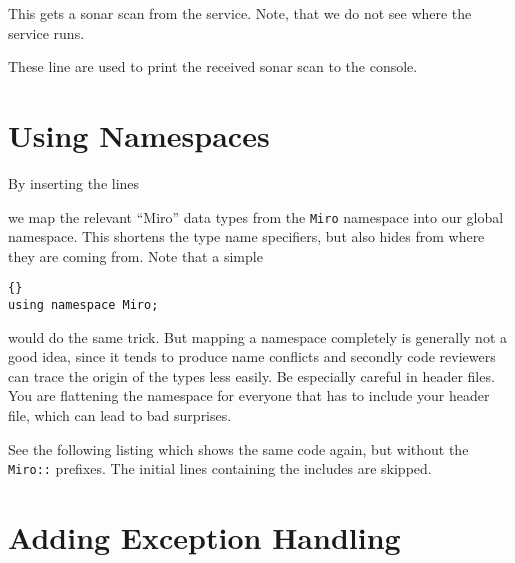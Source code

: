

This gets a sonar scan from the service. Note, that we do not see where 
the service runs.



These line are used to print the received sonar scan to the console.

%




\section{Using Namespaces}

By inserting the lines



we map the relevant ``Miro'' data types from the \lstinline!Miro!
namespace into our global namespace. This shortens the type name
specifiers, but also hides from where they are coming from. Note that
a simple

\begin{lstlisting}[frame=tb]{}
using namespace Miro;
\end{lstlisting}

would do the same trick. But mapping a namespace completely is
generally not a good idea, since it tends to produce name conflicts
and secondly code reviewers can trace the origin of the types less
easily. Be especially careful in header files. You are flattening the
namespace for everyone that has to include your header file, which can
lead to bad surprises.

See the following listing which shows the same code again, but without
the \lstinline!Miro::! prefixes. The initial lines containing the includes
are skipped.


\label{lst:SonarPoll2}


\section{Adding Exception Handling}

